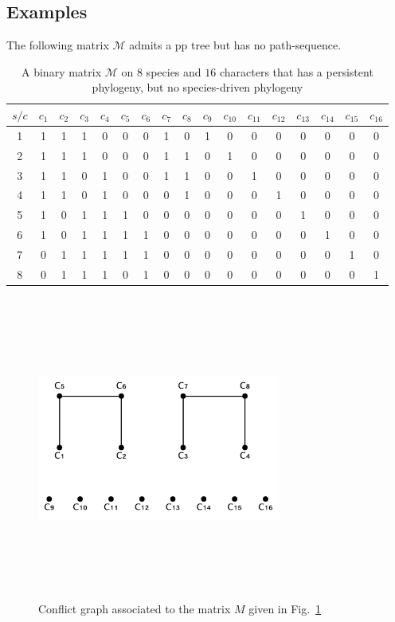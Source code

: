 \subsection{Examples}

The following matrix $\mathcal M$ admits a pp tree but has no path-sequence.

\begin{table}
\centering
\begin{tabularx}{1.0\linewidth}[c]{c|cccccccccccccccc}
    $s/c$ & $c_1$ & $c_2$ & $c_3$ & $c_4$ & $c_5$ & $c_6$ & $c_7$ & $c_8$ & $c_9$ & $c_{10}$ &
$c_{11}$ & $c_{12}$ & $c_{13}$ & $c_{14}$ & $c_{15}$ & $c_{16}$\\\hline
1 & 1 & 1 & 1 & 0 & 0 & 0 & 1 & 0 & 1 & 0 & 0 & 0 & 0 & 0 & 0 & 0 \\
2 & 1 & 1 & 1 & 0 & 0 & 0 & 1 & 1 & 0 & 1 & 0 & 0 & 0 & 0 & 0 & 0 \\
3 & 1 & 1 & 0 & 1 & 0 & 0 & 1 & 1 & 0 & 0 & 1 & 0 & 0 & 0 & 0 & 0 \\
4 & 1 & 1 & 0 & 1 & 0 & 0 & 0 & 1 & 0 & 0 & 0 & 1 & 0 & 0 & 0 & 0 \\
5 & 1 & 0 & 1 & 1 & 1 & 0 & 0 & 0 & 0 & 0 & 0 & 0 & 1 & 0 & 0 & 0 \\
6 & 1 & 0 & 1 & 1 & 1 & 1 & 0 & 0 & 0 & 0 & 0 & 0 & 0 & 1 & 0 & 0 \\
7 & 0 & 1 & 1 & 1 & 1 & 1 & 0 & 0 & 0 & 0 & 0 & 0 & 0 & 0 & 1 & 0 \\
8 & 0 & 1 & 1 & 1 & 0 & 1 & 0 & 0 & 0 & 0 & 0 & 0 & 0 & 0 & 0 & 1 \\
\end{tabularx}
\caption{A binary matrix  $\mathcal M$ on $8$ species and $16$
  characters that has a persistent phylogeny, but no species-driven phylogeny}
\label{table:matAmmetteP-pp}
\end{table}


\begin{figure}[htbp]
\centering
\includegraphics[height=10cm, width=8cm,keepaspectratio]{GrafoConflitti1}
\caption{Conflict graph associated to the matrix  $M$ given in Fig.~\ref{table:matAmmetteP-pp} }
\label{fig:GcM}
\end{figure}


